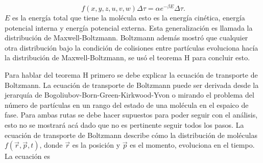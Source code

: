 \begin{equation}
f(x,y,z,u,v,w) \Delta \tau = \alpha e^{-\beta E} \Delta \tau.
\end{equation}
$E$ es la energía total que tiene la molécula esto es la energía cinética, energía potencial interna y energía potencial externa. Esta generalización es llamada la distribución de Maxwell-Boltzmann. Boltzmann además mostró que cualquier otra distribución bajo la condición de colisiones entre partículas evoluciona hacía la distribución de Maxwell-Boltzmann, se usó el teorema H para concluir esto.

Para hablar del teorema H primero se debe explicar la ecuación de transporte de Boltzmann. La ecuación de transporte de Boltzmann puede ser derivada desde la jerarquía de Bogoliubov-Born-Green-Kirkwood-Yvon o mirando el problema del número de partículas en un rango del estado de una molécula en el espaico de fase. Para ambas rutas se debe hacer supuestos para poder seguir con el análisis, esto no se mostrará acá dado que no es pertinente seguir todos los pasos. La ecuación de transporte de Boltzmann describe cómo la distribución de moléculas $f(\vec{r},\vec{p},t)$, donde $\vec{r}$ es la posición y $\vec{p}$ es el momento,  evoluciona en el tiempo. La ecuación es 


